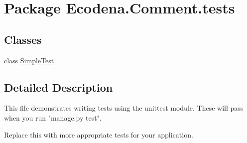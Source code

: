\hypertarget{namespace_ecodena_1_1_comment_1_1tests}{
\section{Package Ecodena.Comment.tests}
\label{d6/d76/namespace_ecodena_1_1_comment_1_1tests}
}
\subsection*{Classes}
\begin{DoxyCompactItemize}
\item 
class \hyperlink{class_ecodena_1_1_comment_1_1tests_1_1_simple_test}{SimpleTest}
\end{DoxyCompactItemize}


\subsection{Detailed Description}
\begin{DoxyVerb}
This file demonstrates writing tests using the unittest module. These will pass
when you run "manage.py test".

Replace this with more appropriate tests for your application.
\end{DoxyVerb}
 